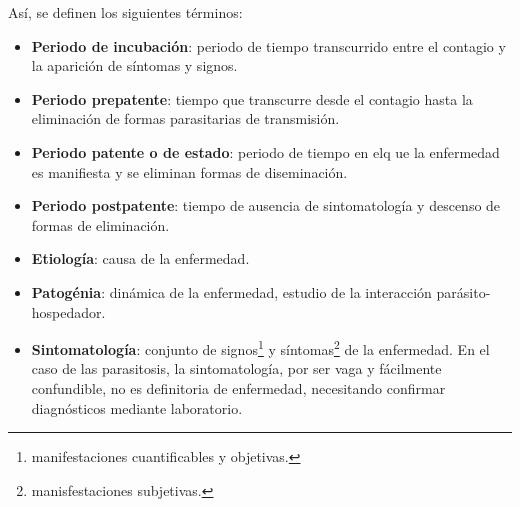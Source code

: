 \documentclass[10pt,a4paper,onecolumn,openany]{book}
\begin{document}
Así, se definen los siguientes términos:
\begin{itemize}[itemsep=0pt,parsep=0pt,topsep=0pt,partopsep=0pt]
	\item \textbf{Periodo de incubación}: periodo de tiempo transcurrido entre el contagio y la aparición de síntomas y signos.
	\item\textbf{Periodo prepatente}: tiempo que transcurre desde el contagio hasta la eliminación de formas parasitarias de transmisión.
	\item\textbf{Periodo patente o de estado}: periodo de tiempo en elq ue la enfermedad es manifiesta y se eliminan formas de diseminación.
	\item\textbf{Periodo postpatente}: tiempo de ausencia de sintomatología y descenso de formas de eliminación.
	\item\textbf{Etiología}: causa de la enfermedad.
	\item\textbf{Patogénia}: dinámica de la enfermedad, estudio de la interacción parásito-hospedador.
	\item\textbf{Sintomatología}: conjunto de signos\footnote{manifestaciones cuantificables y objetivas.} y síntomas\footnote{manisfestaciones subjetivas.} de la enfermedad. En el caso de las parasitosis, la sintomatología, por ser vaga y fácilmente confundible, no es definitoria de enfermedad, necesitando confirmar diagnósticos mediante laboratorio.
\end{itemize}
\end{document}
